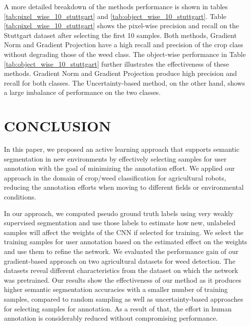 A more detailed breakdown of the methods performance is shown in tables \ref{tab:pixel_wise_10_stuttgart} and \ref{tab:object_wise_10_stuttgart}. Table \ref{tab:pixel_wise_10_stuttgart} shows the pixel-wise precision and recall on the Stuttgart dataset after selecting the first 10 samples. Both methods, Gradient Norm and Gradient Projection have a high recall and precision of the crop class without degrading those of the weed class. The object-wise performance in Table \ref{tab:object_wise_10_stuttgart} further illustrates the effectiveness of these methods. Gradient Norm and Gradient Projection produce high precision and recall for both classes. The Uncertainty-based method, on the other hand, shows a large imbalance of performance on the two classes.
   






\section{CONCLUSION}
\label{sec:conclusion}

In this paper, we proposed an active learning approach that supports semantic
segmentation in new environments by effectively selecting samples for user
annotation with the goal of minimizing the annotation effort. We applied our
approach in the domain of crop/weed classification for agricultural robots,
reducing the annotation efforts when moving to different fields or environmental
conditions.

In our approach, we computed pseudo ground truth labels using very weakly supervised 
segmentation and use those labels to estimate how new, unlabeled samples will 
affect the weights of the CNN if selected for training. We select the training
samples for user annotation based on the estimated effect on the weights and use them to refine the 
network. We evaluated  the performance gain of our gradient-based 
approach on two agricultural  datasets for weed detection. The datasets 
reveal different characteristics from the dataset on which the network was pretrained.
Our results show the effectiveness of our method as it produces higher semantic segmentation
accuracies with a smaller number of training samples, compared to random sampling as
well as uncertainty-based approaches for selecting samples for annotation. As a result
of that, the effort in human annotation is considerably reduced without compromising
performance.
 
 
 



